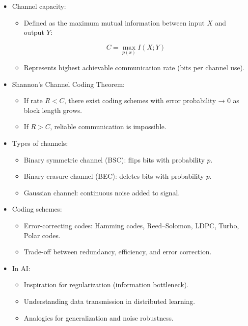 \documentclass[
  letterpaper,
  DIV=11,
  numbers=noendperiod]{scrreprt}
\providecommand{\tightlist}{%
  \setlength{\itemsep}{0pt}\setlength{\parskip}{0pt}}
\begin{document}
\begin{itemize}
\item
  Channel capacity:

  \begin{itemize}
  \item
    Defined as the maximum mutual information between input \(X\) and
    output \(Y\):

    \[
    C = \max_{p(x)} I(X;Y)
    \]
  \item
    Represents highest achievable communication rate (bits per channel
    use).
  \end{itemize}
\item
  Shannon's Channel Coding Theorem:

  \begin{itemize}
  \tightlist
  \item
    If rate \(R < C\), there exist coding schemes with error probability
    → 0 as block length grows.
  \item
    If \(R > C\), reliable communication is impossible.
  \end{itemize}
\item
  Types of channels:

  \begin{itemize}
  \tightlist
  \item
    Binary symmetric channel (BSC): flips bits with probability \(p\).
  \item
    Binary erasure channel (BEC): deletes bits with probability \(p\).
  \item
    Gaussian channel: continuous noise added to signal.
  \end{itemize}
\item
  Coding schemes:

  \begin{itemize}
  \tightlist
  \item
    Error-correcting codes: Hamming codes, Reed--Solomon, LDPC, Turbo,
    Polar codes.
  \item
    Trade-off between redundancy, efficiency, and error correction.
  \end{itemize}
\item
  In AI:

  \begin{itemize}
  \tightlist
  \item
    Inspiration for regularization (information bottleneck).
  \item
    Understanding data transmission in distributed learning.
  \item
    Analogies for generalization and noise robustness.
  \end{itemize}
\end{itemize}
\end{document}
